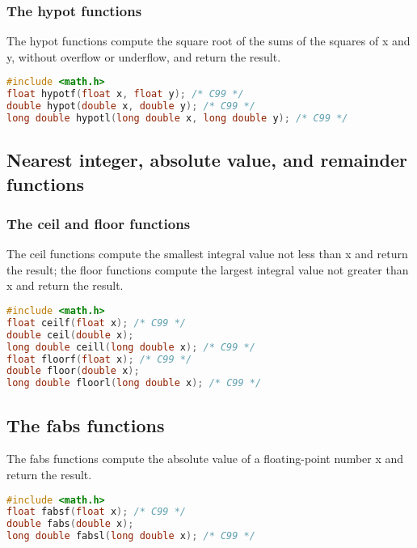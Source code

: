 \subsubsection{The hypot functions}
The hypot functions compute the square root of the sums of the squares of x and
y, without overflow or underflow, and return the result.
\lstset{basicstyle=\scriptsize, numbers=left, captionpos=b, tabsize=4}
\begin{lstlisting}[caption=Section \thesection listing \arabic{furthermathcnt},language={C},
breaklines=true,xleftmargin=15pt, label=lst:section\thesection listing\arabic{furthermathcnt}]
#include <math.h>
float hypotf(float x, float y); /* C99 */
double hypot(double x, double y); /* C99 */
long double hypotl(long double x, long double y); /* C99 */
\end{lstlisting}

\subsection{Nearest integer, absolute value, and remainder functions}
\subsubsection{The ceil and floor functions}
The ceil functions compute the smallest integral value not less than x and
return the result; the floor functions compute the largest integral value not
greater than x and return the result.
\lstset{basicstyle=\scriptsize, numbers=left, captionpos=b, tabsize=4}
\begin{lstlisting}[caption=Section \thesection listing \arabic{furthermathcnt},language={C},
breaklines=true,xleftmargin=15pt, label=lst:section\thesection listing\arabic{furthermathcnt}]
#include <math.h>
float ceilf(float x); /* C99 */
double ceil(double x);
long double ceill(long double x); /* C99 */
float floorf(float x); /* C99 */
double floor(double x);
long double floorl(long double x); /* C99 */
\end{lstlisting}

\subsection{The fabs functions}
The fabs functions compute the absolute value of a floating-point number x and
return the result.
\lstset{basicstyle=\scriptsize, numbers=left, captionpos=b, tabsize=4}
\begin{lstlisting}[caption=Section \thesection listing \arabic{furthermathcnt},language={C},
breaklines=true,xleftmargin=15pt,label=lst:section\thesection listing\arabic{furthermathcnt}]
#include <math.h>
float fabsf(float x); /* C99 */
double fabs(double x); 
long double fabsl(long double x); /* C99 */
\end{lstlisting}

